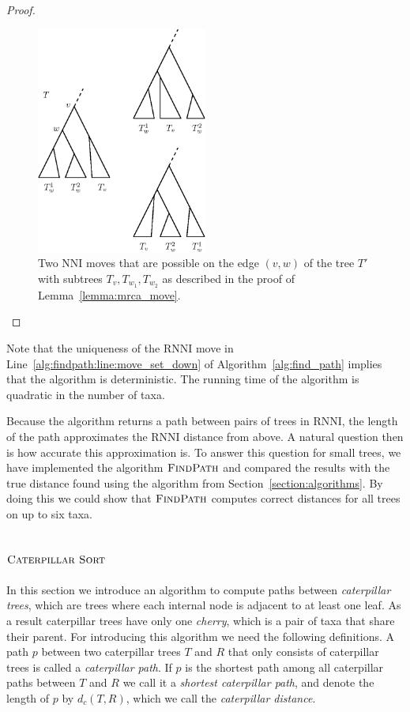 \documentclass{amsart}
\newcommand{\nni}{\mathrm{NNI}}
\newcommand{\rnni}{\mathrm{RNNI}}
\newcommand{\csort}{\textsc{Caterpillar Sort}}
\newcommand{\findpath}{\textsc{FindPath}}
\begin{document}
\begin{proof}
\begin{figure}[H]
\centering
\includegraphics[width=0.5\textwidth]{mrca_move}
\vspace{12pt}
\caption{Two $\nni$ moves that are possible on the edge $(v,w)$ of the tree $T'$ with subtrees $T_v, T_{w_1}, T_{w_2}$ as described in the proof of Lemma~\ref{lemma:mrca_move}.}
\label{fig:mrca_move}
\end{figure}

\end{proof}

Note that the uniqueness of the $\rnni$ move in Line~\ref{alg:findpath:line:move_set_down} of Algorithm~\ref{alg:find_path} implies that the algorithm is deterministic.
The running time of the algorithm is quadratic in the number of taxa.

Because the algorithm returns a path between pairs of trees in $\rnni$, the length of the path approximates the $\rnni$ distance from above.
A natural question then is how accurate this approximation is.
To answer this question for small trees, we have implemented the algorithm $\findpath$
\autocite{}
and compared the results with the true distance found using the algorithm from Section~\ref{section:algorithms}.
By doing this we could show that $\findpath$ computes correct distances for all trees on up to six taxa.

\subsection{$\csort$}
\label{section:alg_csort}

In this section we introduce an algorithm to compute paths between \emph{caterpillar trees}, which are trees where each internal node is adjacent to at least one leaf.
As a result caterpillar trees have only one \emph{cherry}, which is a pair of taxa that share their parent.
For introducing this algorithm we need the following definitions.
A path $p$ between two caterpillar trees $T$ and $R$ that only consists of caterpillar trees is called a \emph{caterpillar path}.
If $p$ is the shortest path among all caterpillar paths between $T$ and $R$ we call it a \emph{shortest caterpillar path}, and denote the length of $p$ by $d_c(T,R)$, which we call the \emph{caterpillar distance}.
\end{document}
